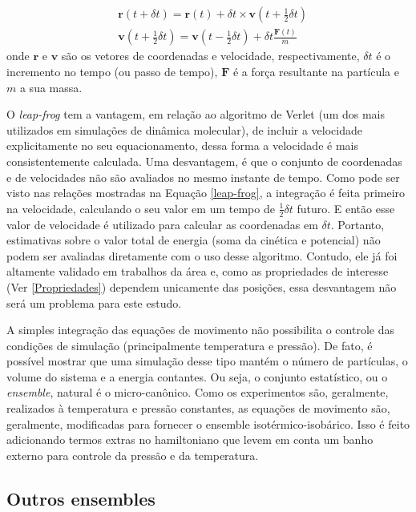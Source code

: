 \begin{equation}
\begin{aligned}
& \textbf{r}(t+\delta t)=\textbf{r}(t)+\delta t \times \textbf{v}(t+\frac{1}{2}\delta t)\\
& \textbf{v}(t+\frac{1}{2}\delta t)=\textbf{v}(t-\frac{1}{2}\delta t)+\delta t \frac{\textbf{F}(t)}{m}
\end{aligned}
\label{leap-frog}
\end{equation}
onde $\textbf{r}$ e $\textbf{v}$ são os vetores de coordenadas e velocidade, respectivamente, $\delta t$ é o incremento no tempo (ou passo de tempo), $\textbf{F}$ é a força resultante na partícula e $m$ a sua massa.

O \textit{leap-frog} tem a vantagem, em relação ao algoritmo de Verlet (um dos mais utilizados em simulações de dinâmica molecular), de incluir a velocidade explicitamente no seu equacionamento, dessa forma a velocidade é mais consistentemente calculada.
Uma desvantagem, é que o conjunto de coordenadas e de velocidades não são avaliados no mesmo instante de tempo. 
Como pode ser visto nas relações mostradas na Equação \ref{leap-frog}, a integração é feita primeiro na velocidade, calculando o seu valor em um tempo de $\frac{1}{2}\delta t$ futuro. E então esse valor de velocidade é utilizado para calcular as coordenadas em $\delta t$.
Portanto, estimativas sobre o valor total de energia (soma da cinética e potencial) não podem ser avaliadas diretamente com o uso desse algoritmo.
Contudo, ele já foi altamente validado em trabalhos da área e, como as propriedades de interesse (Ver \ref{Propriedades}) dependem unicamente das posições, essa desvantagem não será um problema para este estudo\cite{Leach2001}.

A simples integração das equações de movimento não possibilita o controle das condições de simulação (principalmente temperatura e pressão).
De fato, é possível mostrar que uma simulação desse tipo mantém o número de partículas, o volume do sistema e a energia contantes.
Ou seja, o conjunto estatístico, ou o \textit{ensemble}, natural é o micro-canônico\cite{Tuckerman2010}.
Como os experimentos são, geralmente, realizados à temperatura e pressão constantes, as equações de movimento são, geralmente, modificadas para fornecer o ensemble isotérmico-isobárico.
Isso é feito adicionando termos extras no hamiltoniano que levem em conta um banho externo para controle da pressão e da temperatura.

\subsection{Outros ensembles}

